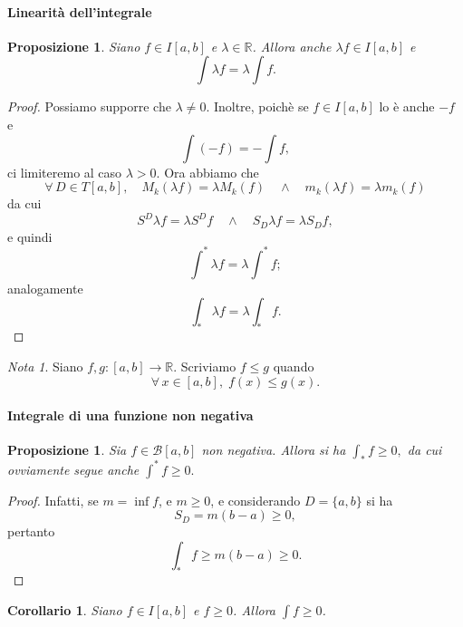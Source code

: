 \documentclass{article}
\theoremstyle{plain}
\newtheorem{prop}[thm]{Proposizione}
\newtheorem{cor}{Corollario}
\theoremstyle{definition}
\theoremstyle{remark}
\newtheorem{note}{Nota}
\begin{document}
\paragraph{Linearità dell'integrale}
\begin{bxthm}
\begin{prop}
    Siano $f\in I[a,b]$ e $\lambda\in\mathbb{R}$. Allora anche $\lambda f\in I[a,b]$ e \[\int \lambda f=\lambda\int f.\]
\end{prop}
\end{bxthm}
\begin{proof}
    Possiamo supporre che $\lambda\neq 0$. 
    Inoltre, poichè se $f\in I[a,b]$ lo è anche $-f$ e \[\int(-f)=-\int f,\] ci limiteremo al caso $\lambda>0$.
    Ora abbiamo che 
    \[\forall\,D\in T[a,b],\quad M_k(\lambda f)=\lambda M_k(f)\quad\land\quad m_k(\lambda f)=\lambda m_k(f)\]
    da cui \[S^D\lambda f=\lambda S^Df\quad\land\quad S_D\lambda f=\lambda S_Df,\] e quindi \[\int^*\lambda f=\lambda \int^*f;\] analogamente \[\int_*\lambda f=\lambda\int_*f.\]
\end{proof}

\vspace{10pt}

\begin{note}
    Siano $f,g:[a,b]\to\mathbb{R}$. 
    Scriviamo $f\leq g$ quando \[\forall\,x\in[a,b],\;f(x)\leq g(x).\]
\end{note}

\vspace{10pt}

\paragraph{Integrale di una funzione non negativa}
\begin{bxthm}
\begin{prop}
    Sia $f\in\mathcal{B}[a,b]$ non negativa. Allora si ha \(\int_*f\geq0,\) da cui ovviamente segue anche \(\int^*f\geq0.\)
\end{prop}
\end{bxthm}
\begin{proof}
    Infatti, se $m=\inf f$, e $m\geq0$, e considerando $D=\{a,b\}$ si ha 
    \[S_D=m(b-a)\geq0,\] 
    pertanto \[\int_*f\geq m(b-a)\geq0.\]
\end{proof}

\vspace{10pt}

\begin{bxthm}
\begin{cor}
    Siano $f\in I[a,b]$ e $f\geq0$. Allora $\int f\geq0$.
\end{cor}
\end{bxthm}
\end{document}
